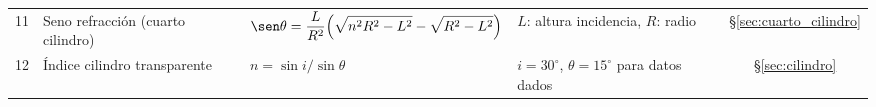 \documentclass[12pt, a4paper]{article}
\theoremstyle{definition}
\begin{document}
\begin{center}
\begin{longtable}{@{}clp{5.5cm}p{3cm}c@{}}
11 & Seno refracción (cuarto cilindro) &
  \(\displaystyle\sen\theta = \frac{L}{R^2}\!\left(\sqrt{n^2R^2-L^2}-\sqrt{R^2-L^2}\right)\) &
  \(L\): altura incidencia, \(R\): radio & \S\ref{sec:cuarto_cilindro} \\[4pt]

12 & Índice cilindro transparente & \(n = \sin i/\sin\theta\) &
  \(i=30^{\circ}\), \(\theta=15^{\circ}\) para datos dados & \S\ref{sec:cilindro} \\

\bottomrule
\end{longtable}
\end{center}
\end{document}
